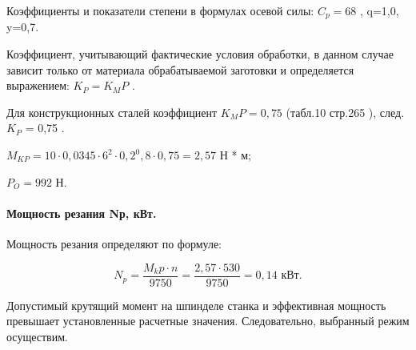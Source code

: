 Коэффициенты и показатели степени в формулах осевой силы:
$C_p = 68$ , q=1,0, y=0,7.

Коэффициент, учитывающий фактические условия обработки, в данном случае зависит только от материала обрабатываемой заготовки и определяется выражением: $K_P = K_MP$ .

Для конструкционных сталей коэффициент $K_MP = 0,75$  (табл.10 стр.265 \cite{TECHNO}), след. $K_P$ = 0,75 .

$M_{KP} = 10 \cdot 0,0345 \cdot 6^2 \cdot 0,2^0,8 \cdot 0,75 = 2,57$ Н * м;

$P_O = 992 $ Н.

\paragraph{Мощность резания  Nр, кВт.}
Мощность резания определяют по формуле:

$$ N_p = \frac{M_kp \cdot n} { 9750} = \frac{2,57 \cdot 530} {9750} = 0,14 \text{ кВт}.$$

Допустимый крутящий момент на шпинделе станка и эффективная мощность превышает установленные расчетные значения. Следовательно, выбранный режим осуществим.
